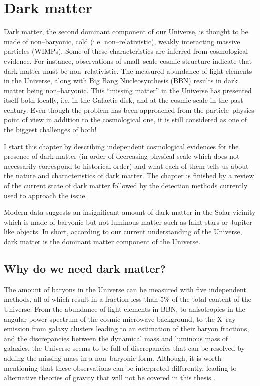 \documentclass[a4wide,12pt]{book}
\begin{document}
{\tableofcontents

\thispagestyle{empty}

\chapter{Dark matter}
Dark matter, the second dominant component of our Universe, is thought to be made of non--baryonic, cold (i.e. non--relativistic), weakly interacting massive particles (WIMPs). Some of these characteristics are inferred from cosmological evidence. For instance, observations of small--scale cosmic structure indicate that dark matter must be non--relativistic.  The measured abundance of light elements in the Universe, along with Big Bang Nucleosynthesis (BBN) results in dark matter being non--baryonic. This ``missing matter'' in the Universe has presented itself both locally, i.e. in the Galactic disk, and at the cosmic scale in the past century. Even though the problem has been approached from the particle--physics point of view in addition to the cosmological one, it is still considered as one of the biggest challenges of both!

I start this chapter by describing independent cosmological evidences for the presence of dark matter (in order of decreasing physical scale which does not necessarily correspond to historical order) and what each of them tells us about the nature and characteristics of dark matter. The chapter is finished by a review of the current state of dark matter followed by the detection methods currently used to approach the issue.

Modern data suggests an insignificant amount of dark matter in the Solar vicinity which is made of baryonic but not luminous matter such as faint stars or Jupiter--like objects. In short, according to our current understanding of the Universe, dark matter is the dominant matter component of the Universe.

\section{Why do we need dark matter?}
The amount of baryons in the Universe can be measured with five independent methods, all of which result in a fraction less than 5\% of the total content of the Universe. From the abundance of light elements in BBN, to anisotropies in the angular power spectrum of the cosmic microwave background, to the X--ray emission from galaxy clusters leading to an estimation of their baryon fractions, and the discrepancies between the dynamical mass and luminous mass of galaxies, the Universe seems to be full of discrepancies that can be resolved by adding the missing mass in a non--baryonic form. Although, it is worth mentioning that these observations can be interpreted differently, leading to alternative theories of gravity that will not be covered in this thesis \citep[but see e.g. ][]{Clifton2006, Clifton+2012, Bloomfield2013}.

}
\end{document}
